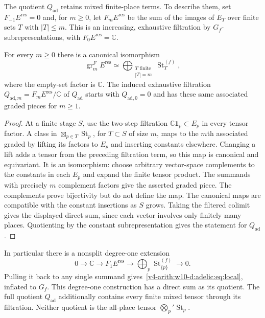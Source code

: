 The quotient $Q_{\mathrm{ad}}$ retains mixed finite-place terms. To describe them, set
$F_{-1}E^{\mathrm{res}}=0$ and, for $m\ge0$, let $F_mE^{\mathrm{res}}$
be the sum of the images of $E_T$ over finite sets $T$ with $|T|\le m$.
This is an increasing, exhaustive filtration by $G_f$-subrepresentations,
with $F_0E^{\mathrm{res}}=\mathbb C$.

\begin{proposition}\label{v4-arith:w10-d:adelic:prop:filtration}
For every $m\ge0$ there is a canonical isomorphism
\[
 \operatorname{gr}_m^F E^{\mathrm{res}}
 \simeq\bigoplus_{\substack{T\text{ finite}\\|T|=m}}\operatorname{St}_T^{(f)},
\]
where the empty-set factor is $\mathbb C$. The induced exhaustive filtration
$Q_{\mathrm{ad},m}=F_mE^{\mathrm{res}}/\mathbb C$ of $Q_{\mathrm{ad}}$ starts with $Q_{\mathrm{ad},0}=0$ and has these
same associated graded pieces for $m\ge1$.
\end{proposition}
\begin{proof}
At a finite stage $S$, use the two-step filtration
$\mathbb C\mathbf1_p\subset E_p$ in every tensor factor. A class in
$\boxtimes_{p\in T}\operatorname{St}_p$, for $T\subset S$ of size $m$, maps to the
$m$th associated graded by lifting its factors to $E_p$ and inserting
constants elsewhere. Changing a lift adds a tensor from the preceding
filtration term, so this map is canonical and equivariant.
It is an isomorphism: choose arbitrary vector-space complements to the
constants in each $E_p$ and expand the finite tensor product. The
summands with precisely $m$ complement factors give the asserted graded
piece. The complements prove bijectivity but do not define the map.
The canonical maps are compatible with the constant insertions as $S$
grows. Taking the filtered colimit gives the displayed direct sum, since
each vector involves only finitely many places. Quotienting by the
constant subrepresentation gives the statement for $Q_{\mathrm{ad}}$.
\end{proof}

In particular there is a nonsplit degree-one extension
\[
 0\longrightarrow\mathbb C\longrightarrow F_1E^{\mathrm{res}}
   \longrightarrow\bigoplus_p\operatorname{St}_{\{p\}}^{(f)}\longrightarrow0.
\]
Pulling it back to any single summand gives~\eqref{v4-arith:w10-d:adelic:eq:local}, inflated
to $G_f$. This degree-one construction has a direct sum as its quotient.
The full quotient $Q_{\mathrm{ad}}$ additionally contains every finite mixed tensor
through its filtration. Neither quotient is the all-place tensor
$\bigotimes_p'\operatorname{St}_p$.

